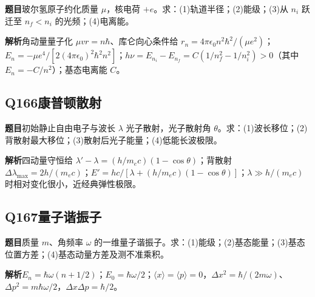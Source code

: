 \textbf{题目}\quad 玻尔氢原子约化质量 $\mu$，核电荷 $+e$。求：(1)轨道半径；(2)能级；(3)从 $n_i$ 跃迁至 $n_f<n_i$ 的光频；(4)电离能。

\par\textbf{解析}\quad 角动量量子化 $\mu vr=n\hbar$、库仑向心条件给 $r_n=4\pi\epsilon_0n^2\hbar^2/(\mu e^2)$；$E_n=-\mu e^4/[2(4\pi\epsilon_0)^2\hbar^2n^2]$；$h\nu=E_{n_i}-E_{n_f}=C(1/n_f^2-1/n_i^2)>0$（其中 $E_n=-C/n^2$）；基态电离能 $C$。

\par\medskip

\subsection*{Q166\quad 康普顿散射}

\textbf{题目}\quad 初始静止自由电子与波长 $\lambda$ 光子散射，光子散射角 $\theta$。求：(1)波长移位；(2)背散射最大移位；(3)散射后光子能量；(4)低能长波极限。

\par\textbf{解析}\quad 四动量守恒给 $\lambda'-\lambda=(h/m_ec)(1-\cos\theta)$；背散射 $\Delta\lambda_{\max}=2h/(m_ec)$；$E'=hc/[\lambda+(h/m_ec)(1-\cos\theta)]$；$\lambda\gg h/(m_ec)$ 时相对变化很小，近经典弹性极限。

\par\medskip

\subsection*{Q167\quad 量子谐振子}

\textbf{题目}\quad 质量 $m$、角频率 $\omega$ 的一维量子谐振子。求：(1)能级；(2)基态能量；(3)基态位置方差；(4)基态动量方差及测不准乘积。

\par\textbf{解析}\quad $E_n=\hbar\omega(n+1/2)$；$E_0=\hbar\omega/2$；$\langle x\rangle=\langle p\rangle=0$，$\Delta x^2=\hbar/(2m\omega)$、$\Delta p^2=m\hbar\omega/2$，$\Delta x\Delta p=\hbar/2$。

\par\medskip
